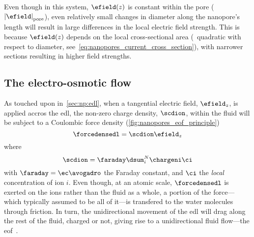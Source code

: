 %
Even though in this system, $\efield (z)$ is constant within the pore ($\left| \efield
\right|_{\text{pore}}$), even relatively small changes in diameter along the nanopore's length will result in
large differences in the local electric field strength. This is because $\efield (z)$ depends on the local
cross-sectional area (\ie~quadratic with respect to diameter, see~\cref{eq:nanopores_current_cross_section}),
with narrower sections resulting in higher field strengths.


\subsection{The electro-osmotic flow}
%
\label{sec:np:eof}
%

As touched upon in~\cref{sec:np:edl}, when a tangential electric field, $\efield_z$, is applied accros the
\gls{edl}, the non-zero charge density, $\scdion$, within the fluid will be subject to a Coulombic force
density (\cref{fig:nanopores_eof_principle})
%
\begin{equation}\label{eq:nanopores_edl_force}
  \forcedensedl = \scdion \efield_z
\end{equation}
%
where
%
\begin{equation}\label{eq:nanopores_ion_scd}
  \scdion = \faraday \dsum_i^N \chargeni \ci
\end{equation}
%
with $\faraday = \ec \avogadro$ the Faraday constant, and $\ci$ the \emph{local} concentration of ion $i$.
Even though, at an atomic scale, $\forcedensedl$ is exerted on the ions rather than the fluid as a whole, a
portion of the force---which typically assumed to be all of it---is transfered to the water molecules through
friction. In turn, the unidirectional movement of the \gls{edl} will drag along the rest of the fluid, charged
or not, giving rise to a unidirectional fluid flow---the \acrfull{eof}~\cite{Bocquet-2010}.


